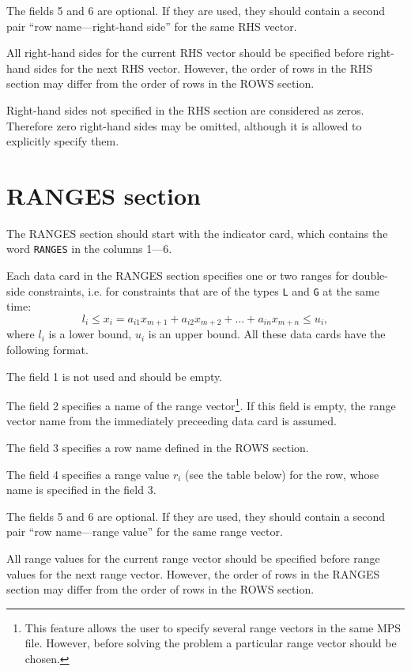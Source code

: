 The fields 5 and 6 are optional. If they are used, they should contain
a second pair ``row name---right-hand side'' for the same RHS vector.

All right-hand sides for the current RHS vector should be specified
before right-hand sides for the next RHS vector. However, the order of
rows in the RHS section may differ from the order of rows in the ROWS
section.

Right-hand sides not specified in the RHS section are considered as
zeros. Therefore zero right-hand sides may be omitted, although it is
allowed to explicitly specify them.

\newpage

\section{RANGES section}

The RANGES section should start with the indicator card, which contains
the word \verb|RANGES| in the columns 1---6.

Each data card in the RANGES section specifies one or two ranges for
double-side constraints, i.e. for constraints that are of the types
\verb|L| and \verb|G| at the same time:
$$l_i \leq x_i = a_{i1}x_{m+1} + a_{i2}x_{m+2} + \dots + a_{in}x_{m+n}
\leq u_i,$$
where $l_i$ is a lower bound, $u_i$ is an upper bound. All these data
cards have the following format.

The field 1 is not used and should be empty.

The field 2 specifies a name of the range vector\footnote{This feature
allows the user to specify several range vectors in the same MPS file.
However, before solving the problem a particular range vector should be
chosen.}. If this field is empty, the range vector name from the
immediately preceeding data card is assumed.

The field 3 specifies a row name defined in the ROWS section.

The field 4 specifies a range value $r_i$ (see the table below) for the
row, whose name is specified in the field 3.

The fields 5 and 6 are optional. If they are used, they should contain
a second pair ``row name---range value'' for the same range vector.

All range values for the current range vector should be specified before
range values for the next range vector. However, the order of rows in
the RANGES section may differ from the order of rows in the ROWS
section.

